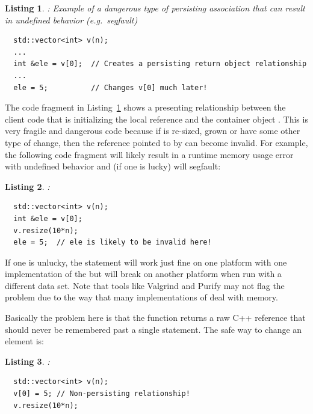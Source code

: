 \documentclass[pdf,ps2pdf,11pt]{SANDreport}
\newtheorem{listing}{Listing}
\begin{document}
{}\begin{listing}: Example of a dangerous type of persisting
association that can result in undefined behavior (e.g.\ segfault)
\label{listing:bad-perist-example}
{\small\begin{verbatim}
  std::vector<int> v(n);
  ...
  int &ele = v[0];  // Creates a persisting return object relationship
  ...
  ele = 5;          // Changes v[0] much later!
\end{verbatim}}
\end{listing}


The code fragment in Listing~\ref{listing:bad-perist-example} shows a
presenting relationship between the client code that is initializing
the local reference {} and the {} container
object {}.  This is very fragile and dangerous code because if
{} is re-sized, grown or have some other type of change, then
the reference pointed to by {} can become invalid.  For
example, the following code fragment will likely result in a runtime
memory usage error with undefined behavior and (if one is lucky) will
segfault:

\begin{listing}:\\
{\small\begin{verbatim}
  std::vector<int> v(n);
  int &ele = v[0];
  v.resize(10*n);
  ele = 5;  // ele is likely to be invalid here!
\end{verbatim}}
\end{listing}

If one is unlucky, the statement {} will work just fine on one
platform with one implementation of the {} but will break on
another platform when run with a different data set.  Note that tools like
Valgrind and Purify may not flag the problem due to the way that many
implementations of {} deal with memory.

Basically the problem here is that the
{} function returns a raw C++
reference that should never be remembered past a single statement.
The safe way to change an element is:

\begin{listing}:\\
{\small\begin{verbatim}
  std::vector<int> v(n);
  v[0] = 5; // Non-persisting relationship!
  v.resize(10*n);
\end{verbatim}}
\end{listing}
\end{document}
